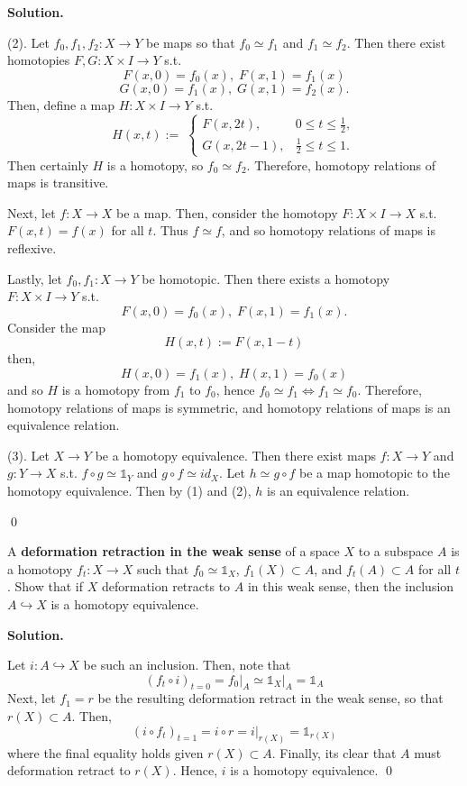 \documentclass[12pt]{book}
\newcommand{\heq}{\simeq}
\newcommand{\id}{\mathds{1}}
\newcommand{\restr}[2]{\left.#1\right|_{#2}}
\theoremstyle{definition}
\newenvironment{solution}
{%
  \par\noindent\textbf{Solution.}\quad
}
{%
  \qed\par
}
{
  \vspace{2pt}
}
\begin{document}
\begin{solution}
  (2). Let $f_0,f_1,f_2: X \to Y$ be maps so that $f_0 \heq f_1$ and $f_1 \heq f_2$. 
  Then there exist homotopies $F, G: X \times I \to Y$ s.t. 
  \[F(x, 0) = f_0(x),\; F(x, 1) = f_1(x)\]
  \[G(x, 0) = f_1(x),\; G(x, 1) = f_2(x).\]
  Then, define a map $H: X \times I \to Y$ s.t.
  \[
    H(x,t) :=\;
    \begin{cases}
      F(x,2t),      & 0 \le t \le \tfrac{1}{2},\\[6pt]
      G(x,2t - 1),  & \tfrac{1}{2} \le t \le 1.
    \end{cases}
  \]
  Then certainly $H$ is a homotopy, so $f_0 \heq f_2$.
  Therefore, homotopy relations of maps is transitive.

  Next, let $f: X \to X$ be a map.
  Then, consider the homotopy $F: X \times I \to X$ s.t. $F(x,t) = f(x)$ for all $t$.
  Thus $f \heq f$, and so homotopy relations of maps is reflexive.

  Lastly, let $f_0, f_1: X \to Y$ be homotopic.
  Then there exists a homotopy $F: X \times I \to Y$ s.t. 
  \[F(x, 0) = f_0(x),\; F(x, 1) = f_1(x).\]
  Consider the map 
  \[H(x, t) := F(x, 1 - t)\]
  then,
  \[H(x, 0) = f_1(x),\; H(x, 1) = f_0(x)\]
  and so $H$ is a homotopy from $f_1$ to $f_0$, hence $f_0 \heq f_1 \iff f_1 \heq f_0$.
  Therefore, homotopy relations of maps is symmetric, and homotopy relations of maps is an equivalence relation.

  (3). Let $X \to Y$ be a homotopy equivalence. 
  Then there exist maps $f: X \to Y$ and $g: Y \to X$ s.t. $f \circ g \heq \id_Y$ and $g \circ f \heq id_X$.
  Let $h \heq g \circ f$ be a map homotopic to the homotopy equivalence. 
  Then by (1) and (2), $h$ is an equivalence relation.

\end{solution}

\begin{taggedexercise}[\textcolor{yellow}{WIP}]
  A \textbf{deformation retraction in the weak sense} of a space $X$ to a subspace $A$ is a homotopy 
  $f_t: X \to X$ such that $f_0 \heq \id_X$, $f_1(X) \subset A$, and $f_t(A) \subset A$ for all $t$.
  Show that if $X$ deformation retracts to $A$ in this weak sense, then the inclusion $A \hookrightarrow X$
  is a homotopy equivalence.
\end{taggedexercise}

\begin{solution}
  Let $i: A \hookrightarrow X$ be such an inclusion.
  Then, note that  
  \[(f_t \circ i)_{t=0} = \restr{f_0}{A} \heq \restr{\id_X}{A} = \id_A\]
  Next, let $f_1 = r$ be the resulting deformation retract in the weak sense, so that $r(X) \subset A$.
  Then, 
  \[(i \circ f_t)_{t=1} = i \circ r = \restr{i}{r(X)} = \id_{r(X)}\]
  where the final equality holds given $r(X) \subset A$.
  Finally, its clear that $A$ must deformation retract to $r(X)$.
  Hence, $i$ is a homotopy equivalence.
\end{solution}
\end{document}
